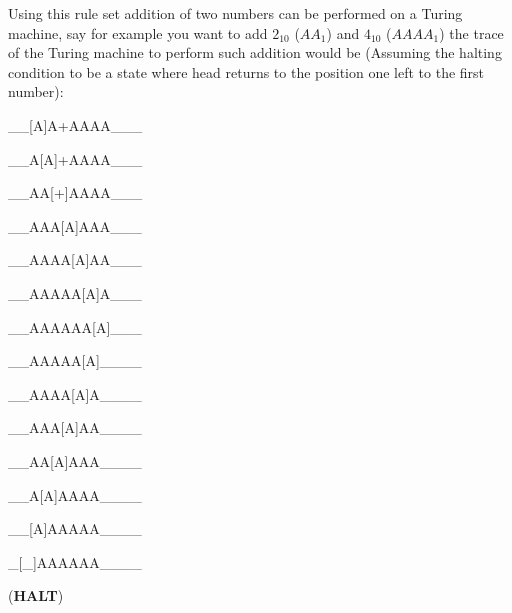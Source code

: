 \documentclass[a4paper,10pt]{article}
\theoremstyle{mytheor}
\begin{document}
{    Using this rule set addition of two numbers can be performed on a
    Turing machine, say for example you want to add $2_{10}$ ($AA_1$)
    and $4_{10}$ ($AAAA_1$) the trace of the Turing machine to perform
    such addition would be (Assuming the halting condition to be a
    state where head returns to the position one left to the first
    number):
    \begin{legal}
    \item \begin{textsc}\_\_[A]A+AAAA\_\_\_\end{textsc}
    \item \begin{textsc}\_\_A[A]+AAAA\_\_\_\end{textsc}
    \item \begin{textsc}\_\_AA[+]AAAA\_\_\_\end{textsc}
    \item \begin{textsc}\_\_AAA[A]AAA\_\_\_\end{textsc}
    \item \begin{textsc}\_\_AAAA[A]AA\_\_\_\end{textsc}
    \item \begin{textsc}\_\_AAAAA[A]A\_\_\_\end{textsc}
    \item \begin{textsc}\_\_AAAAAA[A]\_\_\_\end{textsc}
      
    \item \begin{textsc}\_\_AAAAA[A]\_\_\_\_\end{textsc}
    \item \begin{textsc}\_\_AAAA[A]A\_\_\_\_\end{textsc}
    \item \begin{textsc}\_\_AAA[A]AA\_\_\_\_\end{textsc}
    \item \begin{textsc}\_\_AA[A]AAA\_\_\_\_\end{textsc}
    \item \begin{textsc}\_\_A[A]AAAA\_\_\_\_\end{textsc}
    \item \begin{textsc}\_\_[A]AAAAA\_\_\_\_\end{textsc}
    \item \begin{textsc}\_[\_]AAAAAA\_\_\_\_\end{textsc} (\textbf{HALT})
    \end{legal}

}
\end{document}

